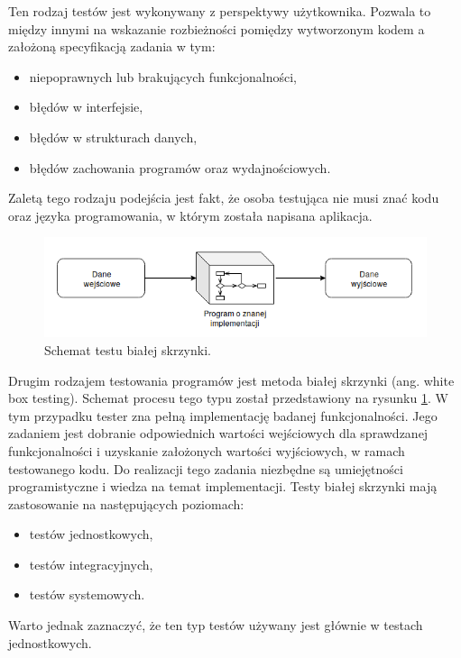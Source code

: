 Ten rodzaj testów jest wykonywany z perspektywy użytkownika.
Pozwala to między innymi na wskazanie rozbieżności pomiędzy wytworzonym kodem a założoną specyfikacją zadania w tym:
\begin {itemize}
    \item niepoprawnych lub brakujących funkcjonalności,
    \item błędów w interfejsie,
    \item błędów w strukturach danych,
    \item błędów zachowania programów oraz wydajnościowych.
\end{itemize}
Zaletą tego rodzaju podejścia jest fakt, że osoba testująca nie musi znać kodu oraz języka programowania, w którym została napisana aplikacja.

\begin{figure}[h]
    \centering
    \includegraphics[width = 13cm]{chapter02/white-box.png}
    \caption{Schemat testu białej skrzynki.}
    \label{fig:white-box}
\end{figure}

Drugim rodzajem testowania programów jest metoda białej skrzynki (ang. white box testing).
Schemat procesu tego typu został przedstawiony na rysunku \ref{fig:white-box}.
W tym przypadku tester zna pełną implementację badanej funkcjonalności.
Jego zadaniem jest dobranie odpowiednich wartości wejściowych dla sprawdzanej funkcjonalności i uzyskanie założonych wartości wyjściowych, w ramach testowanego kodu.
Do realizacji tego zadania niezbędne są umiejętności programistyczne i wiedza na temat implementacji.
Testy białej skrzynki mają zastosowanie na następujących poziomach:
\begin{itemize}
    \item testów jednostkowych,
    \item testów integracyjnych,
    \item testów systemowych.
\end{itemize}
Warto jednak zaznaczyć, że ten typ testów używany jest głównie w testach jednostkowych.

